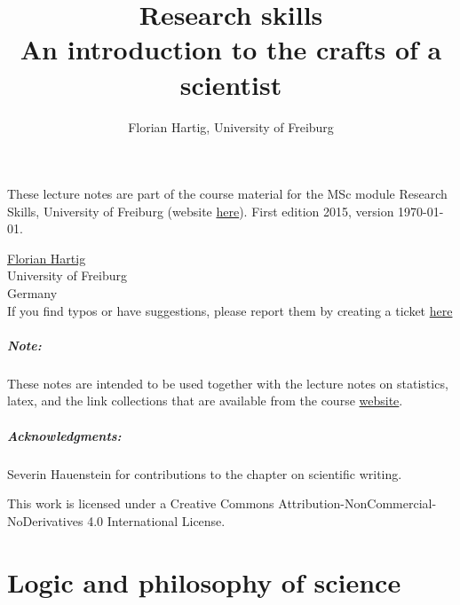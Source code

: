 \documentclass{tufte-book}
\title{Research skills\\
\large{An introduction to the crafts of a scientist}}
\author{Florian Hartig, University of Freiburg}
\begin{document}
\let\cleardoublepage\clearpage
\maketitle


\thispagestyle{empty}
\null

\begin{fullwidth}
These lecture notes are part of the course material for the MSc module Research Skills, University of Freiburg (website \href{http://florianhartig.github.io/ResearchSkills/}{here}). First edition 2015, version \today.\\[0.5cm]
\end{fullwidth}

\href{https://florianhartig.wordpress.com/}{Florian Hartig}\\
University of Freiburg\\
Germany\\[0.2cm]
If you find typos or have suggestions, please report them by creating a ticket \href{https://github.com/florianhartig/ResearchSkills/issues}{here}

\paragraph{Note:} These notes are intended to be used together with the lecture notes on statistics, latex, and the link collections that are available from the course \href{http://florianhartig.github.io/ResearchSkills/}{website}.


\paragraph{Acknowledgments:}Severin Hauenstein for contributions to the chapter on scientific writing.


\vfill
\begin{fullwidth}
This work is licensed under a Creative Commons Attribution-NonCommercial-NoDerivatives 4.0 International License.
\end{fullwidth}


\newpage
\tableofcontents

\newpage



\chapter{Logic and philosophy of science}
\end{document}
